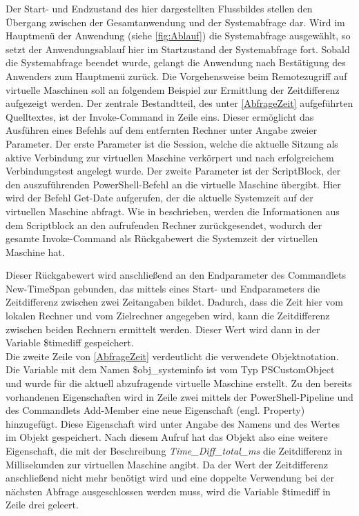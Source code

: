 Der Start- und Endzustand des hier dargestellten Flussbildes stellen den Übergang zwischen der Gesamtanwendung und der Systemabfrage dar. Wird im Hauptmenü der Anwendung (siehe \autoref{fig:Ablauf}) die Systemabfrage ausgewählt, so setzt der Anwendungsablauf hier im Startzustand der Systemabfrage fort. Sobald die Systemabfrage beendet wurde, gelangt die Anwendung nach Bestätigung des Anwenders zum Hauptmenü zurück.
\newpage
Die Vorgehensweise beim Remotezugriff auf virtuelle Maschinen soll an folgendem Beispiel zur Ermittlung der Zeitdifferenz aufgezeigt werden. Der zentrale Bestandtteil, des unter \autoref{AbfrageZeit} aufgeführten Quelltextes, ist der Invoke-Command in Zeile eins. Dieser ermöglicht das Ausführen eines Befehls auf dem entfernten Rechner unter Angabe zweier Parameter. Der erste Parameter ist die Session, welche die aktuelle Sitzung als aktive Verbindung zur virtuellen Maschine verkörpert und nach erfolgreichem Verbindungstest angelegt wurde. Der zweite Parameter ist der ScriptBlock, der den auszuführenden  PowerShell-Befehl an die virtuelle Maschine übergibt. Hier wird der Befehl Get-Date aufgerufen, der die aktuelle Systemzeit auf der virtuellen Maschine abfragt. Wie in  beschrieben, werden die Informationen aus dem Scriptblock an den aufrufenden Rechner zurückgesendet, wodurch der gesamte Invoke-Command als Rückgabewert die Systemzeit der virtuellen Maschine hat. 

Dieser Rückgabewert wird anschließend an den Endparameter des Commandlets New-TimeSpan gebunden, das mittels eines Start- und Endparameters die Zeitdifferenz zwischen zwei Zeitangaben bildet. Dadurch, dass die Zeit hier vom lokalen Rechner und vom Zielrechner angegeben wird, kann die Zeitdifferenz zwischen beiden Rechnern ermittelt werden. Dieser Wert wird dann in der Variable \$timediff gespeichert.\medskip\\
Die zweite Zeile von \autoref{AbfrageZeit} verdeutlicht die verwendete Objektnotation. Die Variable mit dem Namen \$obj\_systeminfo ist vom Typ PSCustomObject und wurde für die aktuell abzufragende virtuelle Maschine erstellt. Zu den bereits vorhandenen Eigenschaften wird in Zeile zwei mittels der PowerShell-Pipeline und des Commandlets Add-Member eine neue Eigenschaft (engl. Property) hinzugefügt. Diese Eigenschaft wird unter Angabe des Namens und des Wertes im Objekt gespeichert. Nach diesem Aufruf hat das Objekt also eine weitere Eigenschaft, die mit der Beschreibung \textit{Time\_Diff\_total\_ms} die Zeitdifferenz in Millisekunden zur virtuellen Maschine angibt. Da der Wert der Zeitdifferenz anschließend nicht mehr benötigt wird und eine doppelte Verwendung bei der nächsten Abfrage ausgeschlossen werden muss, wird die Variable \$timediff in Zeile drei geleert.
